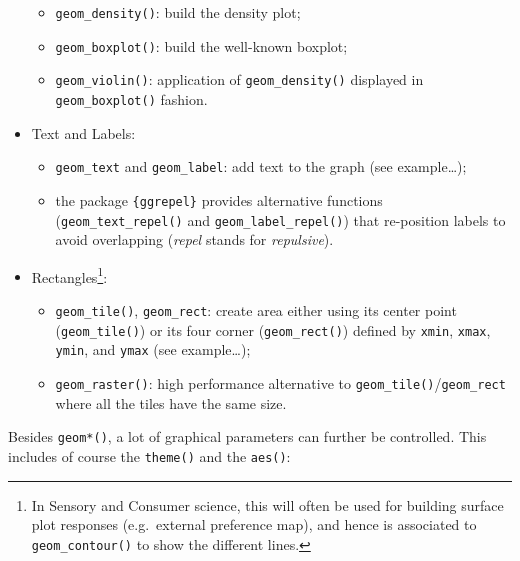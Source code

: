 \documentclass[
]{book}
\providecommand{\tightlist}{%
  \setlength{\itemsep}{0pt}\setlength{\parskip}{0pt}}
\begin{document}
\begin{itemize}
  \begin{itemize}
  \tightlist
  \item
    \texttt{geom\_density()}: build the density plot;
  \item
    \texttt{geom\_boxplot()}: build the well-known boxplot;
  \item
    \texttt{geom\_violin()}: application of \texttt{geom\_density()} displayed in \texttt{geom\_boxplot()} fashion.
  \end{itemize}
\item
  Text and Labels:

  \begin{itemize}
  \tightlist
  \item
    \texttt{geom\_text} and \texttt{geom\_label}: add text to the graph (see example\ldots);
  \item
    the package \texttt{\{ggrepel\}} provides alternative functions (\texttt{geom\_text\_repel()} and \texttt{geom\_label\_repel()}) that re-position labels to avoid overlapping (\emph{repel} stands for \emph{repulsive}).
  \end{itemize}
\item
  Rectangles\footnote{In Sensory and Consumer science, this will often be used for building surface plot responses (e.g.~external preference map), and hence is associated to \texttt{geom\_contour()} to show the different lines.}:

  \begin{itemize}
  \tightlist
  \item
    \texttt{geom\_tile()}, \texttt{geom\_rect}: create area either using its center point (\texttt{geom\_tile()}) or its four corner (\texttt{geom\_rect()}) defined by \texttt{xmin}, \texttt{xmax}, \texttt{ymin}, and \texttt{ymax} (see example\ldots);
  \item
    \texttt{geom\_raster()}: high performance alternative to \texttt{geom\_tile()}/\texttt{geom\_rect} where all the tiles have the same size.
  \end{itemize}
\end{itemize}

Besides \texttt{geom*()}, a lot of graphical parameters can further be controlled. This includes of course the \texttt{theme()} and the \texttt{aes()}:
\end{document}
